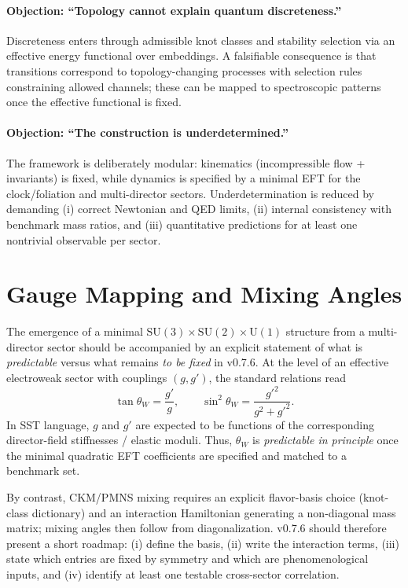 \documentclass[10pt]{article}
\begin{document}
\paragraph{Objection: ``Topology cannot explain quantum discreteness.''}
Discreteness enters through admissible knot classes and stability selection
via an effective energy functional over embeddings. A falsifiable consequence is
that transitions correspond to topology-changing processes with selection rules
constraining allowed channels; these can be mapped to spectroscopic patterns once
the effective functional is fixed.

\paragraph{Objection: ``The construction is underdetermined.''}
The framework is deliberately modular: kinematics (incompressible flow + invariants)
is fixed, while dynamics is specified by a minimal EFT for the clock/foliation and
multi-director sectors. Underdetermination is reduced by demanding (i) correct
Newtonian and QED limits, (ii) internal consistency with benchmark mass ratios,
and (iii) quantitative predictions for at least one nontrivial observable per sector.


\section{Gauge Mapping and Mixing Angles}
\label{sec:v075-mixing}

The emergence of a minimal $\mathrm{SU}(3)\times\mathrm{SU}(2)\times\mathrm{U}(1)$
structure from a multi-director sector should be accompanied by an explicit statement
of what is \emph{predictable} versus what remains \emph{to be fixed} in v0.7.6.
At the level of an effective electroweak sector with couplings $(g,g')$, the standard
relations read
\begin{equation}
\tan\theta_W=\frac{g'}{g},
\qquad
\sin^2\theta_W=\frac{g'^2}{g^2+g'^2}.
\end{equation}
In SST language, $g$ and $g'$ are expected to be functions of the corresponding
director-field stiffnesses / elastic moduli. Thus, $\theta_W$ is \emph{predictable
in principle} once the minimal quadratic EFT coefficients are specified and matched
to a benchmark set.

By contrast, CKM/PMNS mixing requires an explicit flavor-basis choice (knot-class
dictionary) and an interaction Hamiltonian generating a non-diagonal mass matrix;
mixing angles then follow from diagonalization. v0.7.6 should therefore present a
short roadmap: (i) define the basis, (ii) write the interaction terms, (iii) state
which entries are fixed by symmetry and which are phenomenological inputs, and (iv)
identify at least one testable cross-sector correlation.
\end{document}
